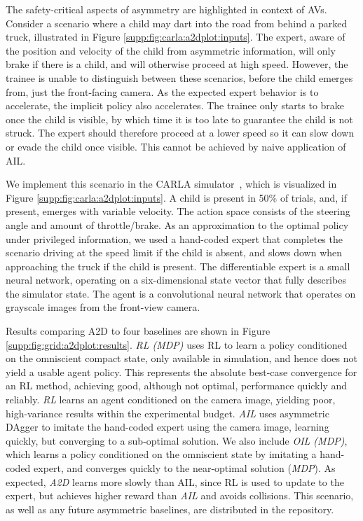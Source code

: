 The safety-critical aspects of asymmetry are highlighted in context of AVs. Consider a scenario where a child may dart into the road from behind a parked truck, illustrated in Figure \ref{supp:fig:carla:a2dplot:inputs}.  The expert, aware of the position and velocity of the child from asymmetric information, will only brake if there is a child, and will otherwise proceed at high speed.  However, the trainee is unable to distinguish between these scenarios, before the child emerges from, just the front-facing camera.  As the expected expert behavior is to accelerate, the implicit policy also accelerates.  The trainee only starts to brake once the child is visible, by which time it is too late to guarantee the child is not struck.  The expert should therefore proceed at a lower speed so it can slow down or evade the child once visible. This cannot be achieved by naive application of AIL.  



We implement this scenario in the CARLA simulator~\citep{Dosovitskiy17}, which is visualized in Figure \ref{supp:fig:carla:a2dplot:inputs}.  A child is present in 50\% of trials, and, if present, emerges with variable velocity.  The action space consists of the steering angle and amount of throttle/brake.  As an approximation to the optimal policy under privileged information, we used a hand-coded expert that completes the scenario driving at the speed limit if the child is absent, and slows down when approaching the truck if the child is present.  The differentiable expert is a small neural network, operating on a six-dimensional state vector that fully describes the simulator state.  The agent is a convolutional neural network that operates on grayscale images from the front-view camera. 

Results comparing A2D to four baselines are shown in Figure \ref{supp:fig:grid:a2dplot:results}.  \emph{RL (MDP)} uses RL to learn a policy conditioned on the omniscient compact state, only available in simulation, and hence does not yield a usable agent policy.  This represents the absolute best-case convergence for an RL method, achieving good, although not optimal, performance quickly and reliably.  \emph{RL} learns an agent conditioned on the camera image, yielding poor, high-variance results within the experimental budget. \emph{AIL} uses asymmetric DAgger to imitate the hand-coded expert using the camera image, learning quickly, but converging to a sub-optimal solution.  We also include \emph{OIL (MDP)}, which learns a policy conditioned on the omniscient state by imitating a hand-coded expert, and converges quickly to the near-optimal solution (\emph{MDP}). As expected, \emph{A2D} learns more slowly than AIL, since RL is used to update to the expert, but achieves higher reward than \emph{AIL} and avoids collisions.  This scenario, as well as any future asymmetric baselines, are distributed in the repository.  
